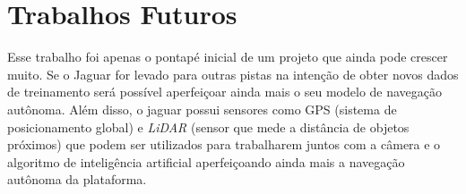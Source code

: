 \section{Trabalhos Futuros}
\label{sec:trabalhos-futuros}

Esse trabalho foi apenas o pontapé inicial de um projeto que ainda pode crescer muito. Se o Jaguar for levado para outras pistas na intenção de obter novos dados de treinamento será possível aperfeiçoar ainda mais o seu modelo de navegação autônoma. Além disso, o jaguar possui sensores como GPS  (sistema de posicionamento global) e \textit{LiDAR} (sensor que mede a distância de objetos próximos) que podem ser utilizados para trabalharem juntos com a câmera e o algoritmo de inteligência artificial aperfeiçoando ainda mais a navegação autônoma da plataforma.